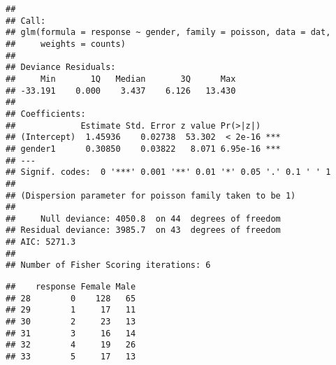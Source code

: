 \documentclass[]{article}
\newenvironment{Shaded}{\begin{snugshade}}{\end{snugshade}}
\newcommand{\KeywordTok}[1]{\textcolor[rgb]{0.13,0.29,0.53}{\textbf{#1}}}
\newcommand{\DecValTok}[1]{\textcolor[rgb]{0.00,0.00,0.81}{#1}}
\newcommand{\StringTok}[1]{\textcolor[rgb]{0.31,0.60,0.02}{#1}}
\newcommand{\OperatorTok}[1]{\textcolor[rgb]{0.81,0.36,0.00}{\textbf{#1}}}
\newcommand{\NormalTok}[1]{#1}
\begin{document}
\begin{verbatim}
## 
## Call:
## glm(formula = response ~ gender, family = poisson, data = dat, 
##     weights = counts)
## 
## Deviance Residuals: 
##     Min       1Q   Median       3Q      Max  
## -33.191    0.000    3.437    6.126   13.430  
## 
## Coefficients:
##             Estimate Std. Error z value Pr(>|z|)    
## (Intercept)  1.45936    0.02738  53.302  < 2e-16 ***
## gender1      0.30850    0.03822   8.071 6.95e-16 ***
## ---
## Signif. codes:  0 '***' 0.001 '**' 0.01 '*' 0.05 '.' 0.1 ' ' 1
## 
## (Dispersion parameter for poisson family taken to be 1)
## 
##     Null deviance: 4050.8  on 44  degrees of freedom
## Residual deviance: 3985.7  on 43  degrees of freedom
## AIC: 5271.3
## 
## Number of Fisher Scoring iterations: 6
\end{verbatim}

\begin{Shaded}
\end{Shaded}

\begin{verbatim}
##    response Female Male
## 28        0    128   65
## 29        1     17   11
## 30        2     23   13
## 31        3     16   14
## 32        4     19   26
## 33        5     17   13
\end{verbatim}
\end{document}
